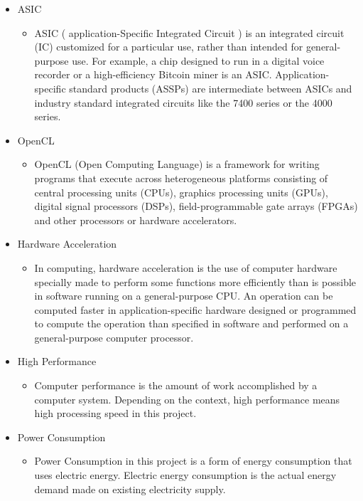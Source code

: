 \documentclass[parskip=full]{scrartcl}
\begin{document}
\begin{itemize}
	
	\item ASIC
	\begin{itemize}
		\item ASIC ( application-Specific Integrated Circuit ) is an integrated circuit (IC) customized for a particular use, rather than intended for general-purpose use. For example, a chip designed to run in a digital voice recorder or a high-efficiency Bitcoin miner is an ASIC. Application-specific standard products (ASSPs) are intermediate between ASICs and industry standard integrated circuits like the 7400 series or the 4000 series.
	\end{itemize}
	
	
	\item OpenCL
	\begin{itemize}
		\item OpenCL (Open Computing Language) is a framework for writing programs that execute across heterogeneous platforms consisting of central processing units (CPUs), graphics processing units (GPUs), digital signal processors (DSPs), field-programmable gate arrays (FPGAs) and other processors or hardware accelerators.
	\end{itemize}
	
	
	\item Hardware Acceleration
	\begin{itemize}
		\item In computing, hardware acceleration is the use of computer hardware specially made to perform some functions more efficiently than is possible in software running on a general-purpose CPU. An operation can be computed faster in application-specific hardware designed or programmed to compute the operation than specified in software and performed on a general-purpose computer processor.
	\end{itemize}
	
	
	\item High Performance
	\begin{itemize}
		\item Computer performance is the amount of work accomplished by a computer system. Depending on the context, high performance means high processing speed in this project.
	\end{itemize}
	
	
	\item Power Consumption
	\begin{itemize}
		\item Power Consumption in this project is a form of energy consumption that uses electric energy. Electric energy consumption is the actual energy demand made on existing electricity supply.
	\end{itemize}
	

\end{itemize}
\end{document}
